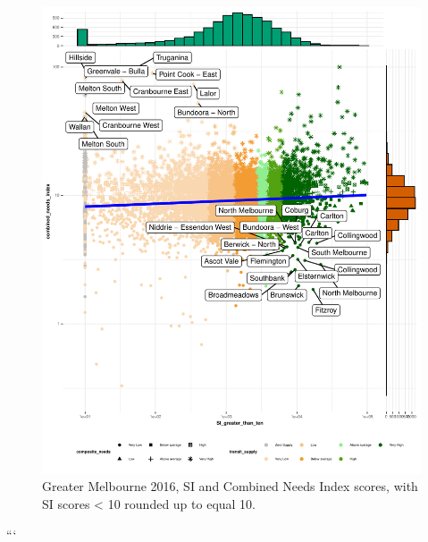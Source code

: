 \documentclass[preprint, 3p,
authoryear]{elsarticle} %
\begin{document}
\begin{figure}
\centering
\includegraphics{ReynoldsCurrieQu2024_files/figure-latex/Greater_Melbourne_2016_needs_gap_scatterplot_figure-1.pdf}
\caption{Greater Melbourne 2016, SI and Combined Needs Index scores,
with SI scores \textless{} 10 rounded up to equal 10.}
\end{figure}

```


\end{document}
